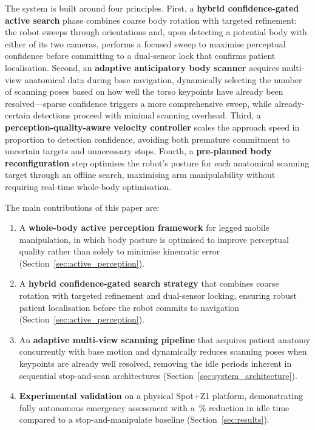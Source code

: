 The system is built around four principles. First, a \textbf{hybrid
confidence-gated active search} phase combines coarse body rotation with
targeted refinement: the robot sweeps through orientations and, upon
detecting a potential body with either of its two cameras, performs a focused
sweep to maximise perceptual confidence before committing to a dual-sensor
lock that confirms patient localisation. Second, an \textbf{adaptive
anticipatory body scanner} acquires multi-view anatomical data during base
navigation, dynamically selecting the number of scanning poses based on how
well the torso keypoints have already been resolved---sparse confidence
triggers a more comprehensive sweep, while already-certain detections proceed
with minimal scanning overhead. Third, a \textbf{perception-quality-aware
velocity controller} scales the approach speed in proportion to detection
confidence, avoiding both premature commitment to uncertain targets and
unnecessary stops. Fourth, a \textbf{pre-planned body reconfiguration} step
optimises the robot's posture for each anatomical scanning target through an
offline search, maximising arm manipulability without requiring real-time
whole-body optimisation.

The main contributions of this paper are:
\begin{enumerate}
  \item A \textbf{whole-body active perception framework} for legged mobile
        manipulation, in which body posture is optimised to improve
        perceptual quality rather than solely to minimise kinematic error
        (Section~\ref{sec:active_perception}).
  \item A \textbf{hybrid confidence-gated search strategy} that combines
        coarse rotation with targeted refinement and dual-sensor locking,
        ensuring robust patient localisation before the robot commits to
        navigation (Section~\ref{sec:active_perception}).
  \item An \textbf{adaptive multi-view scanning pipeline} that acquires
        patient anatomy concurrently with base motion and dynamically reduces
        scanning poses when keypoints are already well resolved, removing the
        idle periods inherent in sequential stop-and-scan architectures
        (Section~\ref{sec:system_architecture}).
  \item \textbf{Experimental validation} on a physical Spot+Z1 platform,
        demonstrating fully autonomous emergency assessment with a
        \XX\,\% reduction in idle time compared to a stop-and-manipulate
        baseline (Section~\ref{sec:results}).
\end{enumerate}

